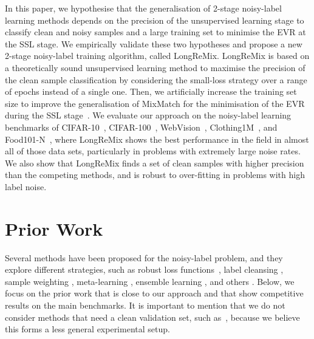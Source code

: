 \documentclass{article}
\begin{document}
In this paper, we hypothesise that the generalisation of 2-stage noisy-label learning methods depends on the precision of the unsupervised learning stage to classify clean and noisy samples and a large training set to minimise the EVR at the SSL stage. We empirically validate these two hypotheses and propose a new 2-stage noisy-label training algorithm, called LongReMix. LongReMix is based on a theoretically sound unsupervised learning method to maximise the precision of the clean sample classification by considering the small-loss strategy over a range of epochs instead of a single one. Then, we artificially increase the training set size to improve the generalisation of MixMatch for the minimisation of the EVR during the SSL stage~\cite{berthelot2019mixmatch}.
We evaluate our approach on the noisy-label learning benchmarks of CIFAR-10~\cite{krizhevsky2009learning}, CIFAR-100~\cite{krizhevsky2009learning}, WebVision~\cite{li2017WebVision}, Clothing1M~\cite{xiao2015learning}, and Food101-N~\cite{lee2018cleannet}, where LongReMix shows the best performance in the field in almost all of those data sets, particularly in problems with extremely large noise rates. We also show that LongReMix finds a set of clean samples with higher precision than the competing methods, and is robust to over-fitting in problems with high label noise.







\section{Prior Work}

Several methods have been proposed for the noisy-label problem, and they explore different strategies, such as robust loss functions~\cite{wang2019imae, wang2019symmetric}, label cleansing \cite{jaehwan2019photometric, yuan2018iterative}, sample weighting \cite{ren2018learning}, meta-learning \cite{han2018pumpout}, ensemble learning \cite{miao2015rboost}, and others \cite{yu2018learning, kim2019nlnl, zhang2019metacleaner}. Below, we focus on the prior work that is close to our approach and that show competitive results on the main benchmarks. It is important to mention that we do not consider methods that need a clean validation set, such as~\cite{zhang2020distilling}, because we believe this forms a less general experimental setup.
\end{document}
